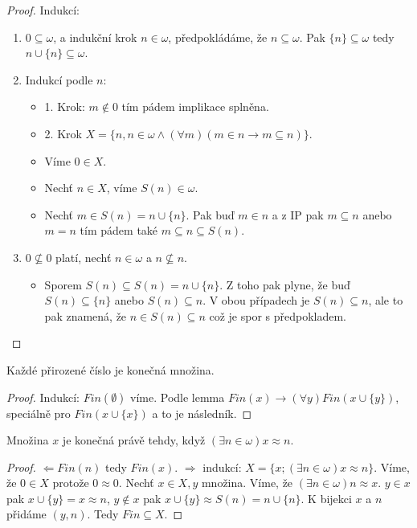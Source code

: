 \begin{proof}
	Indukcí:
	
	\begin{enumerate}
		\item $0 \subseteq \omega$, a indukční krok $n \in \omega$, předpokládáme, že $n \subseteq \omega$. Pak $\{n\} \subseteq \omega$ tedy $n \cup \{n\} \subseteq \omega$.
		\item Indukcí podle $n$:
		\begin{itemize}
			\item 1. Krok: $m \notin 0$ tím pádem implikace splněna.
			\item 2.  Krok $X = \{n, n \in \omega \land (\forall m)(m \in n \rightarrow m \subseteq n)\}$.
			\item Víme $0 \in X$.
			\item Nechť $n \in X$, víme $S(n) \in \omega$.
			\item Nechť $m \in S(n) = n \cup \{n\}$. Pak buď $m \in n$ a z IP pak $m \subseteq n$ anebo $m = n$ tím pádem také $m \subseteq n \subseteq S(n)$.
		\end{itemize}
		\item $0 \nsubseteq 0$ platí, nechť $n \in \omega$ a $n \nsubseteq n$.
		\begin{itemize}
			\item Sporem $S(n) \subseteq S(n) = n \cup \{n\}$. Z toho pak plyne, že buď $S(n) \subseteq \{n\}$ anebo $S(n) \subseteq n$. V obou případech je $S(n) \subseteq n$, ale to pak znamená, že $n \in S(n) \subseteq n$ což je spor s předpokladem.
		\end{itemize}
	\end{enumerate}
\end{proof}

\begin{lemma}
	Každé přirozené číslo je konečná množina.
\end{lemma}

\begin{proof}
	Indukcí: $Fin(\emptyset)$ víme. Podle lemma $Fin(x) \rightarrow (\forall y)Fin(x \cup \{y\})$, speciálně pro $Fin(x \cup \{x\})$ a to je následník.
\end{proof}

\begin{thm}
	Množina $x$ je konečná právě tehdy, když $(\exists n \in \omega) x \approx n$.
\end{thm}

\begin{proof}
	$\Leftarrow Fin(n)$ tedy $Fin(x)$. $\Rightarrow$ indukcí: $X = \{x; (\exists n \in \omega) x \approx n\}$. Víme, že $0 \in X$ protože $0 \approx 0$. Nechť $x \in X, y$ množina. Víme, že $(\exists n \in \omega) n \approx x$. $y \in x$ pak $x \cup \{y\} = x \approx n$, $y \notin x$ pak $x \cup \{y\} \approx S(n) = n \cup \{n\}$. K bijekci $x$ a $n$ přidáme $(y,n)$. Tedy $Fin \subseteq X$.
\end{proof}

